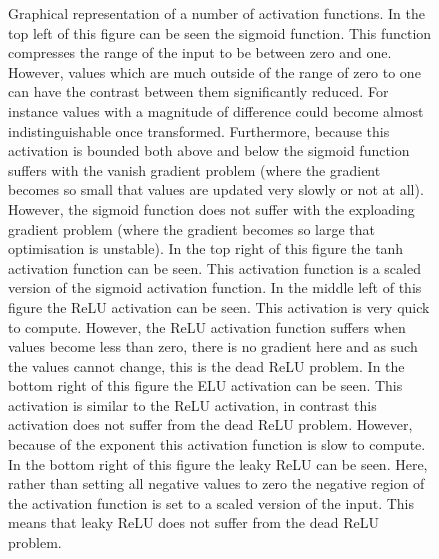 \begin{figure}
                \captionsetup{singlelinecheck=false}
                \caption{
                    Graphical representation of a number of activation functions. In the top left of this figure can be seen the sigmoid function. This function compresses the range of the input to be between zero and one. However, values which are much outside of the range of zero to one can have the contrast between them significantly reduced. For instance values with a magnitude of difference could become almost indistinguishable once transformed. Furthermore, because this activation is bounded both above and below the sigmoid function suffers with the vanish gradient problem (where the gradient becomes so small that values are updated very slowly or not at all). However, the sigmoid function does not suffer with the exploading gradient problem (where the gradient becomes so large that optimisation is unstable). In the top right of this figure the tanh activation function can be seen. This activation function is a scaled version of the sigmoid activation function. In the middle left of this figure the \gls{ReLU} activation can be seen. This activation is very quick to compute. However, the \gls{ReLU} activation function suffers when values become less than zero, there is no gradient here and as such the values cannot change, this is the dead \gls{ReLU} problem. In the bottom right of this figure the \gls{ELU} activation can be seen. This activation is similar to the \gls{ReLU} activation, in contrast this activation does not suffer from the dead \gls{ReLU} problem. However, because of the exponent this activation function is slow to compute. In the bottom right of this figure the leaky \gls{ReLU} can be seen. Here, rather than setting all negative values to zero the negative region of the activation function is set to a scaled version of the input. This means that leaky \gls{ReLU} does not suffer from the dead \gls{ReLU} problem.
                }
                \label{sec:pseudo_bayesian_dip_denoising_as_a_preprocessing_step_for_kinetic_modelling_in_dynamic_pet_appendix_methods_network_design_and_execution_activation_functions}
            \end{figure}

